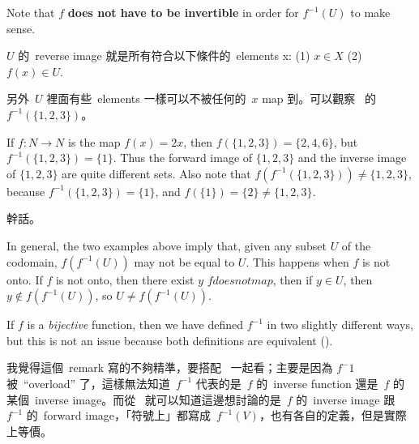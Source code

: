 \begin{note}
Note that \(f\) \textbf{does not have to be invertible} in order for \(f^{-1}(U)\) to make sense.
\end{note}

\begin{note}
\(U\) 的\ reverse image 就是所有符合以下條件的\ elements x: (1) \(x \in X\) (2) \(f(x) \in U\).

另外\ \(U\) 裡面有些\ elements 一樣可以不被任何的\ \(x\) map 到。可以觀察\  的\ \( f^{-1}( \{ 1, 2, 3 \} ) \)。
\end{note}

\begin{example} \label{example 3.4.5}
If \(f : N \rightarrow N\) is the map \(f(x) = 2x\), then \( f( \{ 1, 2, 3 \} ) = \{ 2, 4, 6 \} \), but \( f^{-1}( \{ 1, 2, 3 \} )= \{ 1 \} \).
Thus the forward image of \( \{1, 2, 3 \} \) and the inverse image of \( \{ 1, 2, 3 \} \) are quite different sets.
Also note that \(f(f^{-1}( \{ 1, 2, 3 \} )) \neq \{1, 2, 3\} \), because \( f^{-1}( \{ 1, 2, 3 \} ) = \{1\} \), and \( f( \{1\} ) = \{2\} \neq \{1, 2, 3\} \).
\end{example}

\begin{example}
幹話。
\end{example}

\begin{note}
In general, the two examples above imply that, given any subset \(U\) of the codomain, \(f(f^{-1}(U))\) may not be equal to \(U\).
This happens when \(f\) is not onto.
If \(f\) is not onto, then there exist \(y\) \(f does not map\), then if \(y \in U\), then \(y \notin f(f^{-1}(U))\), so \(U \neq f(f^{-1}(U))\).
\end{note}

\begin{remark} \label{remark 3.4.7}
If \(f\) is a \emph{bijective} function, then we have defined \(f^{−1}\) in two slightly different ways, but this is not an issue because both
definitions are equivalent ().
\end{remark}

\begin{note}
我覺得這個\ remark 寫的不夠精準，要搭配\  一起看；主要是因為 \(f^-1\) 被\ ``overload'' 了，這樣無法知道\ \(f^{-1}\) 代表的是\ \(f\) 的\ inverse function 還是\ \(f\) 的某個\ inverse image。而從\  就可以知道這邊想討論的是\ \(f\) 的\ inverse image 跟\ \(f^{-1}\) 的\ forward image，「符號上」都寫成\  \(f^{-1}(V)\)，也有各自的定義，但是實際上等價。
\end{note}

